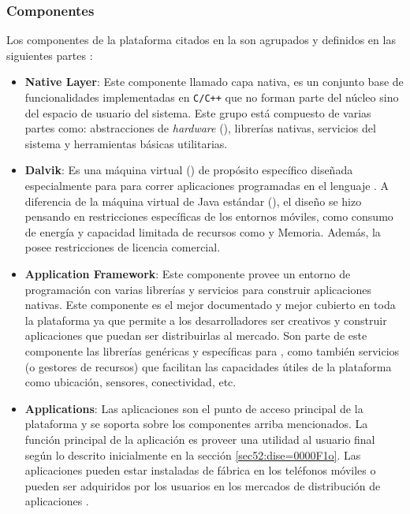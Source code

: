 \subsubsection{Componentes}

Los componentes de la plataforma citados en la 
son agrupados y definidos en las siguientes partes \cite{Gargenta2014}:
\begin{itemize}
\item \textbf{Native Layer}: Este componente llamado capa nativa, es un
conjunto base de funcionalidades implementadas en \texttt{C/C++} que
no forman parte del núcleo sino del espacio de usuario del sistema.
Este grupo está compuesto de varias partes como: abstracciones de
\emph{hardware} (), librerías nativas, servicios del sistema
y herramientas básicas utilitarias.
\item \textbf{Dalvik}: Es una máquina virtual () de propósito
específico diseñada especialmente para  para correr
aplicaciones programadas en el lenguaje  \cite{Ehringer2010}.
A diferencia de la máquina virtual de Java estándar (),
el diseño se hizo pensando en restricciones específicas de los entornos
móviles, como consumo de energía y capacidad limitada de recursos
como  y Memoria. Además, la  posee restricciones
de licencia comercial.
\item \textbf{Application Framework}: Este componente provee un entorno
de programación con varias librerías y servicios para construir aplicaciones
nativas. Este componente es el mejor documentado y mejor cubierto
en toda la plataforma ya que permite a los desarrolladores ser creativos
y construir aplicaciones que puedan ser distribuirlas al mercado.
Son parte de este componente las librerías  genéricas
y específicas para  \cite{OHA2008r}, como también
servicios (o gestores de recursos) que facilitan las capacidades útiles
de la plataforma como ubicación, sensores, conectividad, etc. 
\item \textbf{Applications}: Las aplicaciones son el punto de acceso principal
de la plataforma y se soporta sobre los componentes arriba mencionados.
La función principal de la aplicación es proveer una utilidad al usuario
final según lo descrito inicialmente en la sección \ref{sec52:dise=0000F1o}.
Las aplicaciones pueden estar instaladas de fábrica en los teléfonos
móviles o pueden ser adquiridos por los usuarios en los mercados de
distribución de aplicaciones .
\end{itemize}

